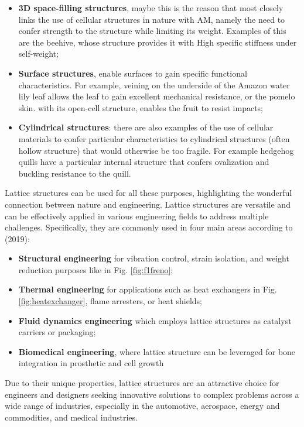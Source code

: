 \begin{itemize}
    \item \textbf{3D space-filling structures}, maybe this is the reason that most closely links the use of cellular structures in nature with AM, namely the need to confer strength to the structure while limiting its weight. Examples of this are the beehive, whose structure provides it with High specific stiffness under self-weight;
    \item \textbf{Surface structures}, enable surfaces to gain specific functional characteristics. For example, veining on the underside of the Amazon water lily leaf allows the leaf to gain excellent mechanical resistance, or the pomelo skin. with its open-cell structure, enables the fruit to resist impacts;
    \item \textbf{Cylindrical structures}: there are also examples of the use of cellular materials to confer particular characteristics to cylindrical structures (often hollow structure) that would otherwise be too fragile. For example hedgehog quills have a particular internal structure that confers ovalization and buckling resistance to the quill.
\end{itemize}
Lattice structures can be used for all these purposes, highlighting the wonderful connection between nature and engineering. Lattice structures are versatile and can be effectively applied in various engineering fields to address multiple challenges. Specifically, they are commonly used in four main areas according to \citeauthor{bhate_classification_2019} (2019): 
\begin{itemize}
    \item \textbf{Structural engineering} for vibration control, strain isolation, and weight reduction purposes like in Fig. \ref{fig:f1freno};
    \item \textbf{Thermal engineering} for applications such as heat exchangers in Fig. \ref{fig:heatexchanger}, flame arresters, or heat shields;
    \item \textbf{Fluid dynamics engineering} which employs lattice structures as catalyst carriers or packaging;
    \item \textbf{Biomedical engineering}, where lattice structure can be leveraged for bone integration in prosthetic and cell growth
\end{itemize} 
Due to their unique properties, lattice structures are an attractive choice for engineers and designers seeking innovative solutions to complex problems across a wide range of industries, especially in the automotive, aerospace, energy and commodities, and medical industries.
